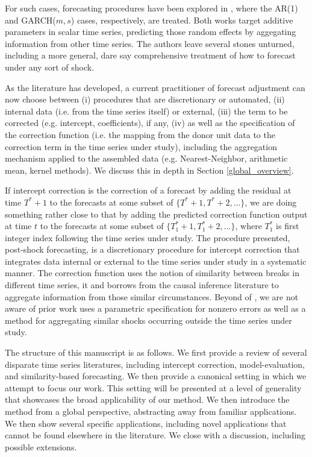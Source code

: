 \documentclass[11pt]{article}
\theoremstyle{definition}
\begin{document}
For such cases, forecasting procedures have been explored in \cite{lin2021minimizing,lundquist2024volatility}, where the AR(1) and GARCH($m,s$) cases, respectively, are treated.  Both works target additive parameters in scalar time series, predicting those random effects by aggegating information from other time series.  The authors leave several stones unturned, including a more general, dare say comprehensive treatment of how to forecast under any sort of shock.

As the literature has developed, a current practitioner of forecast adjustment can now choose between (i) procedures that are discretionary or automated, (ii) internal data (i.e. from the time series itself) or external, (iii) the term to be corrected (e.g. intercept, coefficients), if any, (iv) as well as the specification of the correction function (i.e. the mapping from the donor unit data to the correction term in the time series under study), including the aggregation mechanism applied to the assembled data (e.g. Nearest-Neighbor, arithmetic mean, kernel methods).  We discuss this in depth in Section \ref{global_overview}.

If intercept correction is the correction of a forecast by adding the residual at time $T^{*}+1$ to the forecasts at some subset of $\{T^{*}+1,T^{*}+2,...\}$, we are doing something rather close to that by adding the predicted correction function output at time $t$ to the forecasts at some subset of $\{T_{1}^{*}+1,T_{1}^{*}+2,...\}$, where $T^{*}_{1}$ is first integer index following the time series under study. 
The procedure presented, post-shock forecasting, is a discretionary procedure for intercept correction that integrates data internal or external to the time series under study in a systematic manner.  The correction function uses the notion of similarity between breaks in different time series, it and borrows from the causal inference literature to aggregate information from those similar circumstances.  Beyond of \citet{lin2021minimizing,lundquist2024volatility}, we are not aware of prior work uses a parametric specification for nonzero errors as well as a method for aggregating similar shocks occurring outside the time series under study.

The structure of this manuscript is as follows.  We first provide a review of several disparate time series literatures, including intercept correction, model-evaluation, and similarity-based forecasting.  We then provide a canonical setting in which we attempt to focus our work.  This setting will be presented at a level of generality that showcases the broad applicability of our method.  We then introduce the method from a global perspective, abstracting away from familiar applications.  We then show several specific applications, including novel applications that cannot be found elsewhere in the literature.  We close with a discussion, including possible extensions.
\end{document}
